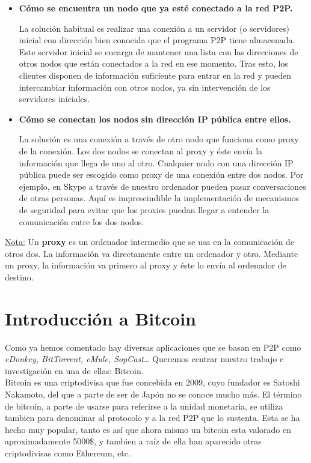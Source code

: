 \documentclass[11pt,a4paper]{article}
\begin{document}
\begin{itemize}

	\item \textbf{Cómo se encuentra un nodo que ya esté conectado a la red P2P.}

La solución habitual es realizar una conexión a un servidor (o servidores) inicial con dirección bien conocida que el programa P2P tiene almacenada. Este servidor inicial se encarga de mantener una lista con las direcciones de otros nodos que están conectados a la red en ese momento. Tras esto, los clientes disponen de información suficiente para entrar en la red y pueden intercambiar información con otros nodos, ya sin intervención de los servidores iniciales.

	\item \textbf{Cómo se conectan los nodos sin dirección IP pública entre ellos.}

La solución es una conexión a través de otro nodo que funciona como proxy de la conexión. Los dos nodos se conectan al proxy y éste envía la información que llega de uno al otro. Cualquier nodo con una dirección IP pública puede ser escogido como proxy de una conexión entre dos nodos. Por ejemplo, en Skype a través de nuestro ordenador pueden pasar conversaciones de otras personas. Aquí es imprescindible la implementación de  mecanismos de seguridad para evitar que los proxies puedan llegar a entender la comunicación entre los dos nodos.

\end{itemize}

\underline{Nota:} Un \textbf{proxy} es un ordenador intermedio que se usa en la comunicación de otros dos. La información va directamente entre un ordenador y otro. Mediante un proxy, la información va primero al proxy y éste lo envía al ordenador de destino.

\section{Introducción a Bitcoin}

Como ya hemos comentado hay diversas aplicaciones que se basan en P2P como \textit{eDonkey, BitTorrent, eMule, SopCast…} Queremos centrar nuestro trabajo e investigación en una de ellas: Bitcoin.\\

Bitcoin es una criptodivisa que fue concebida en 2009, cuyo fundador es Satoshi Nakamoto, del que a parte de ser de Japón no se conoce mucho más. El término de bitcoin, a parte de usarse para referirse a la unidad monetaria, se utiliza tambien para denominar al protocolo y a la red P2P que lo sustenta. Esta se ha hecho muy popular, tanto es así que ahora mismo un bitcoin esta valorado en aproximadamente 5000\$, y tambien a raíz de ella han aparecido otras criptodivisas como Ethereum, etc.\\
\end{document}
